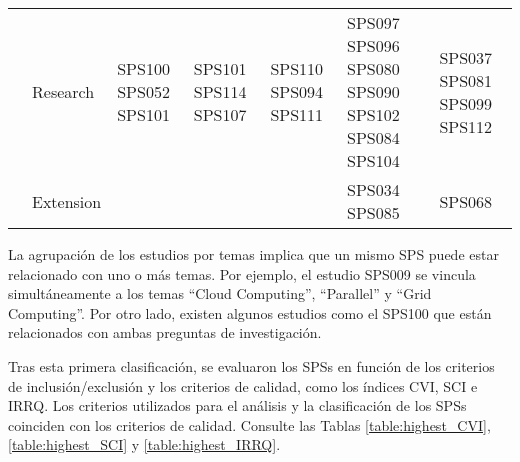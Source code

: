\begin{table*}[htbp]
\begin{tabularx}{\textwidth}{p{0.8cm}p{2.5cm}>{\raggedright\arraybackslash}X>{\raggedright\arraybackslash}X>{\raggedright\arraybackslash}X>{\raggedright\arraybackslash}X>{\raggedright\arraybackslash}X}
		\addlinespace[0.3em]
		                                      & Research                & SPS100 SPS052 SPS101                                    & SPS101 SPS114 SPS107                                                                                                          & SPS110 SPS094 SPS111                                                                       & SPS097 SPS096 SPS080 SPS090 SPS102 SPS084 SPS104                                    & SPS037 SPS081 SPS099 SPS112        \\
		\addlinespace[0.3em]
		                                      & Extension               &                                                         &                                                                                                                               &                                                                                            & SPS034 SPS085                                                                       & SPS068                             \\
		\bottomrule
	\end{tabularx}
\end{table*}





La agrupación de los estudios por temas implica que un mismo SPS puede estar relacionado con uno o más temas. Por ejemplo, el estudio SPS009 se vincula simultáneamente a los temas ``Cloud Computing'', ``Parallel'' y ``Grid Computing''. Por otro lado, existen algunos estudios como el SPS100 que están relacionados con ambas preguntas de investigación.

Tras esta primera clasificación, se evaluaron los SPSs en función de los criterios de inclusión/exclusión y los criterios de calidad, como los índices CVI, SCI e IRRQ. Los criterios utilizados para el análisis y la clasificación de los SPSs coinciden con los criterios de calidad. Consulte las Tablas \ref{table:highest_CVI}, \ref{table:highest_SCI} y \ref{table:highest_IRRQ}.


